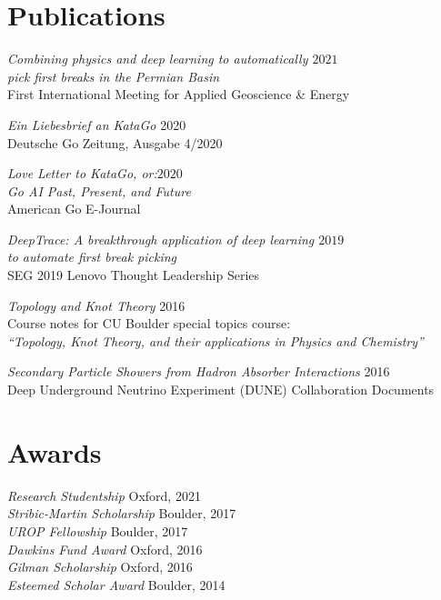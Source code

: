 \documentclass[margin]{res}
\begin{document}
\begin{resume}
\section{Publications} {\sl Combining physics and deep learning to automatically \hfill            $2021$ \\ pick first breaks in the Permian Basin} \\
		First International Meeting for Applied Geoscience \& Energy

                {\sl Ein Liebesbrief an KataGo} \hfill 2020 \\
                Deutsche Go Zeitung, Ausgabe 4/2020

                {\sl Love Letter to KataGo, or:\hfill $2020$\\ Go AI Past, Present, and Future} \\
                American Go E-Journal
                
                {\sl DeepTrace: A breakthrough application of deep learning \hfill $2019$\\ to automate first break picking}  \\
                SEG 2019 Lenovo Thought Leadership Series

                {\sl Topology and Knot Theory} \hfill 2016 \\
                Course notes for CU Boulder special topics course: \\
                \textit{``Topology, Knot Theory, and their applications in Physics and Chemistry''}
                
                {\sl Secondary Particle Showers from Hadron Absorber Interactions} \hfill 2016 \\
                Deep Underground Neutrino Experiment (DUNE) Collaboration Documents

                
                \section{Awards}
                
                {\sl Research Studentship} \hfill Oxford, 2021 \\
                {\sl Stribic-Martin Scholarship} \hfill Boulder, 2017 \\
                        {\sl UROP Fellowship} \hfill Boulder, 2017 \\
                        {\sl Dawkins Fund Award} \hfill Oxford, 2016 \\
                        {\sl Gilman Scholarship} \hfill Oxford, 2016 \\
                        {\sl Esteemed Scholar Award} \hfill Boulder, 2014 \\




                

\end{resume}
\end{document}

